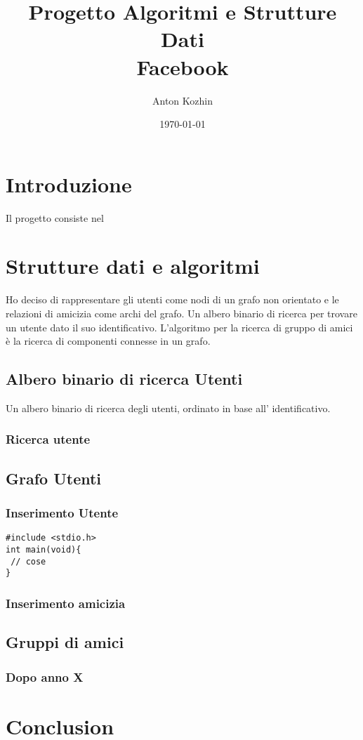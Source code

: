 \documentclass{article}
\begin{document}
\title{
  {Progetto Algoritmi e Strutture Dati} \\
  {Facebook}
}
\author{ Anton Kozhin }
\date{\today}
\maketitle

\section{Introduzione}
Il progetto consiste nel

\section{Strutture dati e algoritmi}
Ho deciso di rappresentare gli utenti come nodi di un grafo non orientato e
le relazioni di amicizia come archi del grafo.
Un albero binario di ricerca per trovare un utente dato il suo
identificativo.
L'algoritmo per la ricerca di gruppo di amici è la ricerca di componenti
connesse in un grafo.
\subsection{Albero binario di ricerca Utenti}
Un albero binario di ricerca degli utenti, ordinato in base all' identificativo.

\subsubsection{Ricerca utente}
\subsection{Grafo Utenti}
\subsubsection{Inserimento Utente}
\begin{lstlisting}
#include <stdio.h>
int main(void){
 // cose
}
\end{lstlisting}
\subsubsection{Inserimento amicizia}
\subsection{Gruppi di amici}
\subsubsection{Dopo anno X}

\section{Conclusion}
\end{document}
